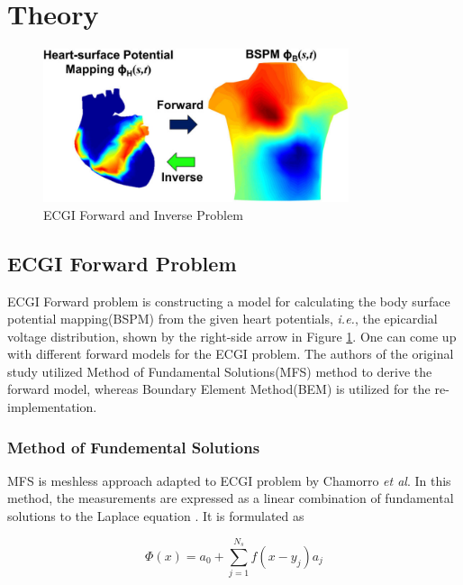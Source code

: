 \documentclass[draftcls, onecolumn, journal]{IEEEtran}
\begin{document}
\section{Theory}\label{sec:theory}

\begin{figure}[h]
    \centering
    \includegraphics[width=0.8\textwidth]{../images/The-illustration-of-forward-and-inverse-ECG-problems.png}
    \caption{ECGI Forward and Inverse Problem}\label{fig:ECG}
\end{figure}

\subsection{ECGI Forward Problem}\label{subsec:ecgfor}

\indent ECGI Forward problem is constructing a model for calculating the body surface potential mapping(BSPM) from the given heart potentials, \textit{i.e.}, the epicardial voltage distribution, shown by the right-side arrow in Figure \ref{fig:ECG}. One can come up with different forward models for the ECGI problem. The authors of the original study utilized Method of Fundamental Solutions(MFS) method to derive the forward model, whereas Boundary Element Method(BEM) is utilized for the re-implementation. 

\subsubsection{Method of Fundemental Solutions} \label{subsec:MFS}
\indent MFS is meshless approach adapted to ECGI problem by Chamorro \textit{et al}. In this method, the measurements are expressed as a linear combination of fundamental solutions to the Laplace equation \cite*{wang2006application}. It is formulated as

\begin{equation}
    \Phi (x) = a_0 + \sum\limits_{j=1}^{N_s} f(x-y_j)a_j
    \label{eq:MFS}
\end{equation}
\end{document}
